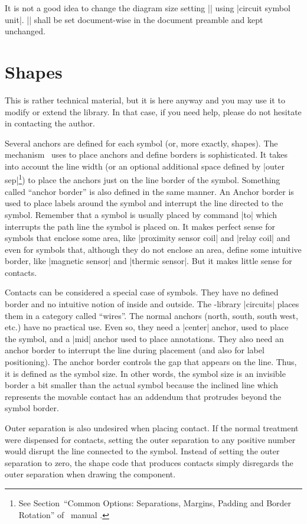 \documentclass[a4paper]{ltxdoc}
\begin{document}
It is not a good idea to change the diagram size setting |\tikzcircuitssizeunit| using |circuit symbol unit|. |\tikzcircuitssizeunit| shall be set document-wise in the document preamble and kept unchanged.
 

\section{Shapes}
This is rather technical material, but it is here anyway and you may use it to modify or extend the library. In that case, if you need help, please do not hesitate in contacting the author. 

Several anchors are defined for each symbol (or, more exactly, shapes). The mechanism \tikzname\ uses to place anchors and define borders is sophisticated. It takes into account the line width (or an optional additional space defined by |outer sep|\footnote{See Section~``Common Options: Separations, Margins, Padding and Border Rotation'' of \tikzname\ manual \cite{Tantau}.})  to place the anchors just on the line border of the symbol. Something called ``anchor border'' is also defined in the same manner. An Anchor border is used to place labels around the symbol and interrupt the line directed to the symbol. Remember that a symbol is usually placed by command |to| which interrupts the path line the symbol is placed on. It makes perfect sense for symbols that enclose some area, like |proximity sensor coil| and |relay coil| and even for symbols that, although they do not enclose an area, define some intuitive border, like |magnetic sensor| and |thermic sensor|. But it makes little sense for contacts.

Contacts can be considered a special case of symbols. They have no defined border and no intuitive notion of inside and outside. The \tikzname-library |circuits| places them in a category called ``wires''. The normal anchors (north, south, south west, etc.) have no practical use. Even so, they need a |center| anchor, used to place the symbol, and a |mid| anchor used to place annotations. They also need an anchor border to interrupt the line during placement (and also for label positioning). The anchor border controls the gap that appears on the line. Thus, it is defined as the symbol size. In other words, the symbol size is an invisible border a bit smaller than the actual symbol because the inclined line which represents the movable contact has an addendum that protrudes beyond the symbol border.

Outer separation is also undesired when placing contact. If the normal treatment were dispensed for contacts, setting the outer separation to any positive number would disrupt the line connected to the symbol. Instead of setting the outer separation to zero, the shape code that produces contacts simply disregards the outer separation when drawing the component. 
\end{document}
